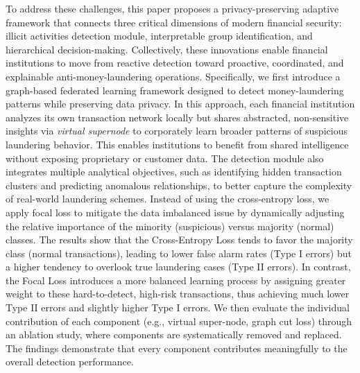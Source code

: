 To address these challenges, this paper proposes a privacy-preserving adaptive framework that connects three critical dimensions of modern financial security: illicit activities detection module, interpretable group identification, and hierarchical decision-making. Collectively, these innovations enable financial institutions to move from reactive detection toward proactive, coordinated, and explainable anti-money-laundering operations. Specifically, we first introduce a graph-based federated learning framework designed to detect money-laundering patterns while preserving data privacy. In this approach, each financial institution analyzes its own transaction network locally but shares abstracted, non-sensitive insights via \textit{virtual supernode} to corporately learn broader patterns of suspicious laundering behavior. This enables institutions to benefit from shared intelligence without exposing proprietary or customer data. The detection module also integrates multiple analytical objectives, such as identifying hidden transaction clusters and predicting anomalous relationships, to better capture the complexity of real-world laundering schemes. Instead of using the cross-entropy loss, we apply focal loss to mitigate the data imbalanced issue by dynamically adjusting the relative importance of the minority (suspicious) versus majority (normal) classes. The results show that the Cross-Entropy Loss tends to favor the majority class (normal transactions), leading to lower false alarm rates (Type I errors) but a higher tendency to overlook true laundering cases (Type II errors). In contrast, the Focal Loss introduces a more balanced learning process by assigning greater weight to these hard-to-detect, high-risk transactions, thus achieving much lower Type II errors and slightly higher Type I errors. We then evaluate the individual contribution of each component (e.g., virtual super-node, graph cut loss) through an ablation study, where components are systematically removed and replaced. The findings demonstrate that every component contributes meaningfully to the overall detection performance.

